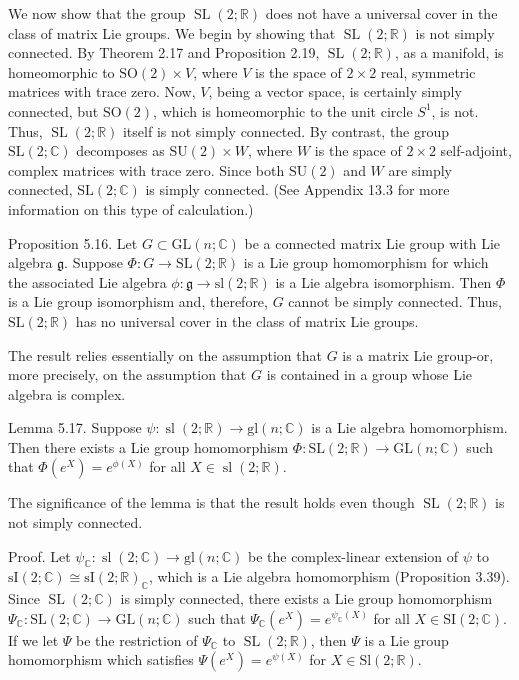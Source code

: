 \documentclass[10pt, letterpaper]{article}
\begin{document}
We now show that the group $\operatorname{SL}(2 ; \mathbb{R})$ does not have a universal cover in the class of matrix Lie groups. We begin by showing that $\operatorname{SL}(2 ; \mathbb{R})$ is not simply connected. By Theorem 2.17 and Proposition 2.19, $\operatorname{SL}(2 ; \mathbb{R})$, as a manifold, is homeomorphic to $\mathrm{SO}(2) \times V$, where $V$ is the space of $2 \times 2$ real, symmetric matrices with trace zero. Now, $V$, being a vector space, is certainly simply connected, but $\mathrm{SO}(2)$, which is homeomorphic to the unit circle $S^{1}$, is not. Thus, $\operatorname{SL}(2 ; \mathbb{R})$ itself is not simply connected. By contrast, the group $\mathrm{SL}(2 ; \mathbb{C})$ decomposes as $\mathrm{SU}(2) \times W$, where $W$ is the space of $2 \times 2$ self-adjoint, complex matrices with trace zero. Since both $\mathrm{SU}(2)$ and $W$ are simply connected, $\mathrm{SL}(2 ; \mathbb{C})$ is simply connected. (See Appendix 13.3 for more information on this type of calculation.)

Proposition 5.16. Let $G \subset \mathrm{GL}(n ; \mathbb{C})$ be a connected matrix Lie group with Lie algebra $\mathfrak{g}$. Suppose $\Phi: G \rightarrow \mathrm{SL}(2 ; \mathbb{R})$ is a Lie group homomorphism for which the associated Lie algebra $\phi: \mathfrak{g} \rightarrow \mathrm{sl}(2 ; \mathbb{R})$ is a Lie algebra isomorphism. Then $\Phi$ is a Lie group isomorphism and, therefore, $G$ cannot be simply connected. Thus, $\mathrm{SL}(2 ; \mathbb{R})$ has no universal cover in the class of matrix Lie groups.

The result relies essentially on the assumption that $G$ is a matrix Lie group-or, more precisely, on the assumption that $G$ is contained in a group whose Lie algebra is complex.

Lemma 5.17. Suppose $\psi: \operatorname{sl}(2 ; \mathbb{R}) \rightarrow \mathrm{gl}(n ; \mathbb{C})$ is a Lie algebra homomorphism. Then there exists a Lie group homomorphism $\Phi: \mathrm{SL}(2 ; \mathbb{R}) \rightarrow \mathrm{GL}(n ; \mathbb{C})$ such that $\Phi\left(e^{X}\right)=e^{\phi(X)}$ for all $X \in \operatorname{sl}(2 ; \mathbb{R})$.

The significance of the lemma is that the result holds even though $\operatorname{SL}(2 ; \mathbb{R})$ is not simply connected.

Proof. Let $\psi_{\mathbb{C}}: \operatorname{sl}(2 ; \mathbb{C}) \rightarrow \mathrm{gl}(n ; \mathbb{C})$ be the complex-linear extension of $\psi$ to $\mathrm{sI}(2 ; \mathbb{C}) \cong \mathrm{sI}(2 ; \mathbb{R})_{\mathbb{C}}$, which is a Lie algebra homomorphism (Proposition 3.39). Since $\operatorname{SL}(2 ; \mathbb{C})$ is simply connected, there exists a Lie group homomorphism $\Psi_{\mathbb{C}}: \mathrm{SL}(2 ; \mathbb{C}) \rightarrow \mathrm{GL}(n ; \mathbb{C})$ such that $\Psi_{\mathbb{C}}\left(e^{X}\right)=e^{\psi_{\mathbb{C}}(X)}$ for all $X \in \mathrm{SI}(2 ; \mathbb{C})$. If we let $\Psi$ be the restriction of $\Psi_{\mathbb{C}}$ to $\operatorname{SL}(2 ; \mathbb{R})$, then $\Psi$ is a Lie group homomorphism which satisfies $\Psi\left(e^{X}\right)=e^{\psi(X)}$ for $X \in \mathrm{Sl}(2 ; \mathbb{R})$.
\end{document}
